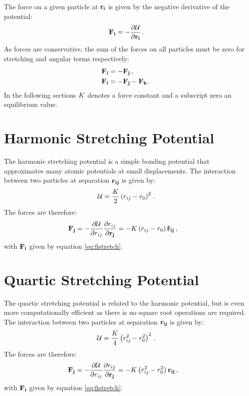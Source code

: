 The force on a given particle at $\mathbf{r_i}$ is given by the negative derivative of the potential:
\begin{equation}
	\mathbf{F_i}=-\frac{\partial \mathcal{U}}{\partial \mathbf{r_i}}\,.
\end{equation}
As forces are conservative, the sum of the forces on all particles must be zero \ie{} for stretching and angular terms respectively:
\begin{align}
	\mathbf{F_i} &= -\mathbf{F_j}\,, \label{eq:fistretch}\\
	\mathbf{F_i} &= -\mathbf{F_j} -\mathbf{F_k}. \label{eq:fiangle}\
\end{align}
In the following sections $K$ denotes a force constant and a subscript zero an equilibrium value.

\section{Harmonic Stretching Potential}

The harmonic stretching potential is a simple bonding potential that approximates many atomic potentials at small displacements.
The interaction between two particles at separation $\mathbf{r_{ij}}$ is given by:
\begin{equation}
	\mathcal{U} = \frac{K}{2}\left(r_{ij}-r_0\right)^2\,.
\end{equation}
The forces are therefore:
\begin{align}
	\mathbf{F_j}&=-\frac{\partial \mathcal{U}}{\partial r_{ij}} \frac{\partial r_{ij}}{\partial \mathbf{r_j}} = -K\left(r_{ij}-r_0\right)\boldsymbol{\hat{\mathbf{r}}_{\mathbf{ij}}}\,,
\end{align}
with $\mathbf{F_i}$ given by equation \eqref{eq:fistretch}.

\section{Quartic Stretching Potential}

The quartic stretching potential is related to the harmonic potential, but is even more computationally efficient as there is no square root operations are required.
The interaction between two particles at separation $\mathbf{r_{ij}}$ is given by:
\begin{equation}
	\mathcal{U} = \frac{K}{4}\left(r_{ij}^2-r_0^2\right)^2\,.
\end{equation}
The forces are therefore:
\begin{align}
	\mathbf{F_j}&=-\frac{\partial \mathcal{U}}{\partial r_{ij}} \frac{\partial r_{ij}}{\partial \mathbf{r_j}} = -K\left(r_{ij}^2-r_0^2\right)\mathbf{r_{ij}}\,,
\end{align}
with $\mathbf{F_i}$ given by equation \eqref{eq:fistretch}.

